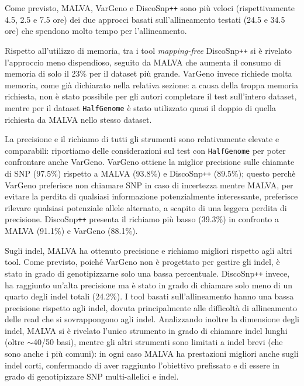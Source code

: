 \documentclass[../main.tex]{subfiles}
\begin{document}
\noindent
Come previsto, MALVA, VarGeno e DiscoSnp\texttt{++} sono più veloci (rispettivamente 4.5, 2.5 e 7.5 ore) dei due approcci basati sull'allineamento testati (24.5 e 34.5 ore) che spendono molto tempo per l'allineamento.

Rispetto all'utilizzo di memoria, tra i tool \textit{mapping-free} DiscoSnp\texttt{++} si è rivelato l'approccio meno dispendioso, seguito da MALVA che aumenta il consumo di memoria di solo il 23\% per il dataset più grande. VarGeno invece richiede molta memoria, come già dichiarato nella relativa sezione: a causa della troppa memoria richiesta, non è stato possibile per gli autori completare il test sull'intero dataset, mentre per il dataset \texttt{HalfGenome} è stato utilizzato quasi il doppio di quella richiesta da MALVA nello stesso dataset.


La precisione e il richiamo di tutti gli strumenti sono relativamente elevate e comparabili: riportiamo delle considerazioni sul test con \texttt{HalfGenome} per poter confrontare anche VarGeno. VarGeno ottiene la miglior precisione sulle chiamate di SNP (97.5\%) rispetto a MALVA (93.8\%) e DiscoSnp\texttt{++} (89.5\%); questo perchè VarGeno preferisce non chiamare SNP in caso di incertezza mentre MALVA, per evitare la perdita di qualsiasi informazione potenzialmente interessante, preferisce rilevare qualsiasi potenziale allele alternato, a scapito di una leggera perdita di precisione. DiscoSnp\texttt{++} presenta il richiamo più basso (39.3\%) in confronto a MALVA (91.1\%) e VarGeno (88.1\%).


Sugli indel, MALVA ha ottenuto precisione e richiamo migliori rispetto agli altri tool. Come previsto, poiché VarGeno non è progettato per gestire gli indel, è stato in grado di genotipizzarne solo una bassa percentuale. DiscoSnp\texttt{++} invece, ha raggiunto un'alta precisione ma è stato in grado di chiamare solo meno di un quarto degli indel totali (24.2\%). I tool basati sull'allineamento hanno una bassa precisione rispetto agli indel, dovuta principalmente alle difficoltà di allineamento delle read che si sovrappongono agli indel. Analizzando inoltre la dimensione degli indel, MALVA si è rivelato l'unico strumento in grado di chiamare indel lunghi (oltre $\sim$40/50 basi), mentre gli altri strumenti sono limitati a indel brevi (che sono anche i più comuni): in ogni caso MALVA ha prestazioni migliori anche sugli indel corti, confermando di aver raggiunto l'obiettivo prefissato e di essere in grado di genotipizzare SNP multi-allelici e indel.\\
\end{document}

